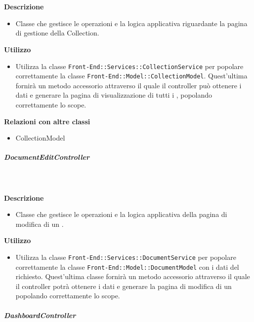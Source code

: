         \textbf{\\ \\ Descrizione} 
          \begin{itemize}
            \item[] Classe che gestisce le operazioni e la logica applicativa riguardante la pagina di gestione della Collection.
          \end{itemize}      
        \textbf{Utilizzo}  
          \begin{itemize}
            \item[] Utilizza la classe \texttt{Front-End::Services::CollectionService} per popolare correttamente la classe \texttt{Front-End::Model::CollectionModel}. Quest'ultima fornirà un metodo accessorio attraverso il quale il controller può ottenere i dati e generare la pagina di visualizzazione di tutti i , popolando correttamente lo scope.
          \end{itemize}
          \textbf{Relazioni con altre classi}
          \begin{itemize}
              \item{CollectionModel}
          \end{itemize}
      \subparagraph{DocumentEditController}
        
        \textbf{\\ \\ Descrizione} 
          \begin{itemize}
            \item[] Classe che gestisce le operazioni e la logica applicativa della pagina di modifica di un .
          \end{itemize}      
        \textbf{Utilizzo}  
          \begin{itemize}
            \item[] Utilizza la classe \texttt{Front-End::Services::DocumentService} per popolare correttamente la classe \texttt{Front-End::Model::DocumentModel} con i dati del  richiesto. Quest'ultima classe fornirà un metodo accessorio attraverso il quale il controller potrà ottenere i dati e generare la pagina di modifica di un  popolando correttamente lo scope.
          \end{itemize}
      \subparagraph{DashboardController}
        
